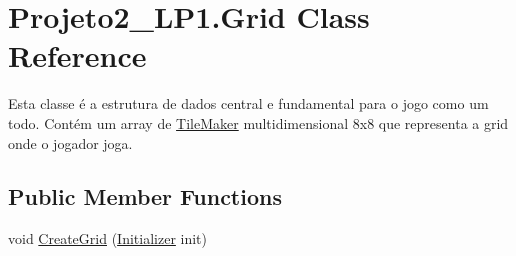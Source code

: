 \hypertarget{class_projeto2___l_p1_1_1_grid}{}\section{Projeto2\+\_\+\+L\+P1.\+Grid Class Reference}
\label{class_projeto2___l_p1_1_1_grid}


Esta classe é a estrutura de dados central e fundamental para o jogo como um todo. Contém um array de \mbox{\hyperlink{class_projeto2___l_p1_1_1_tile_maker}{Tile\+Maker}} multidimensional 8x8 que representa a grid onde o jogador joga.  


\subsection*{Public Member Functions}
\begin{DoxyCompactItemize}
\item 
void \mbox{\hyperlink{class_projeto2___l_p1_1_1_grid_a7f3a7e9c295766d38a08117449cf8d3c}{Create\+Grid}} (\mbox{\hyperlink{class_projeto2___l_p1_1_1_initializer}{Initializer}} init)
\end{DoxyCompactItemize}
